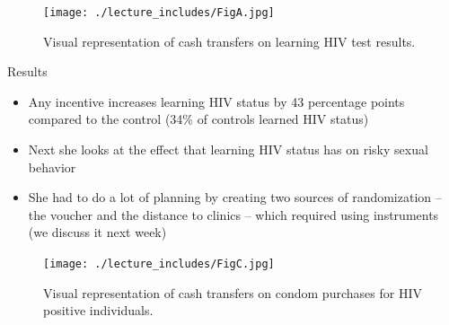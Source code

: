 \documentclass{beamer}
\begin{document}
\begin{frame}[plain]

  \begin{figure}[htb]\centering
    \texttt{[image: ./lecture\_includes/FigA.jpg]}
    \caption{Visual representation of cash transfers on learning HIV test results.}
    \label{fig:thorntonfig}
  \end{figure}

\end{frame}


\begin{frame}{Results}

  \begin{itemize}
    \item Any incentive increases learning HIV status by 43 percentage points compared to the control (34\% of controls learned HIV status)
    \item Next she looks at the effect that learning HIV status has on risky sexual behavior 
    \item She had to do a lot of planning by creating two sources of randomization -- the voucher and the distance to clinics -- which required using instruments (we discuss it next week)
  \end{itemize}

\end{frame}

\begin{frame}[plain]

  \begin{figure}[htb]\centering
    \texttt{[image: ./lecture\_includes/FigC.jpg]}
    \caption{Visual representation of cash transfers on condom purchases for HIV positive individuals.}
    \label{fig:thorntoncondomfig}
  \end{figure}

\end{frame}
\end{document}
